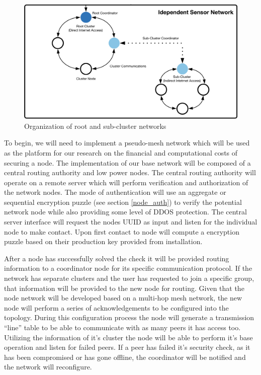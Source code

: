 \documentclass[tikz,a4paper,titlepage]{article}
\begin{document}
\begin{figure}[h]
  \centering
    \includegraphics[width=.9\linewidth]{Images/draft-brypt-architecture-isn.png}
  \caption{Organization of root and sub-cluster networks}
  \label{fig:isn}
\end{figure}


To begin, we will need to implement a pseudo-mesh network which will be used as the platform for our research on the financial and computational costs of securing a node. The implementation of our base network will be composed of a central routing authority and low power nodes. The central routing authority will operate on a remote server which will perform verification and authorization of the network nodes. The mode of authentication will use an aggregate or sequential encryption puzzle (see section \ref{node_auth}) to verify the potential network node while also providing some level of DDOS protection. The central server interface will request the nodes UUID as input and listen for the individual node to make contact. Upon first contact to node will compute a encryption puzzle based on their production key provided from installation.

After a node has successfully solved the check it will be provided routing information to a coordinator node for its specific communication protocol. If the network has separate clusters and the user has requested to join a specific group, that information will be provided to the new node for routing. Given that the node network will be developed based on a multi-hop mesh network, the new node will perform a series of acknowledgements to be configured into the topology. During this configuration process the node will generate a transmission “line” table to be able to communicate with as many peers it has access too. Utilizing the information of it’s cluster the node will be able to perform it’s base operation and listen for failed peers. If a peer has failed it’s security check, as it has been compromised or has gone offline, the coordinator will be notified and the network will reconfigure.
\end{document}
